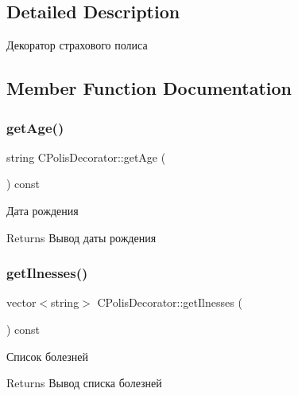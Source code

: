 \subsection{Detailed Description}
Декоратор страхового полиса 

\subsection{Member Function Documentation}
\mbox{\label{classCPolisDecorator_a9e380f2e7020eb4444a0bb3747380918}} 
\subsubsection{\texorpdfstring{get\+Age()}{getAge()}}
{\footnotesize\ttfamily string C\+Polis\+Decorator\+::get\+Age (\begin{DoxyParamCaption}{ }\end{DoxyParamCaption}) const\hspace{0.3cm}{\ttfamily [inline]}}



Дата рождения 

\begin{DoxyReturn}{Returns}
Вывод даты рождения 
\end{DoxyReturn}
\mbox{\label{classCPolisDecorator_ac43dd7017dc2a1dd70d2cf0431cc3e7f}} 
\subsubsection{\texorpdfstring{get\+Ilnesses()}{getIlnesses()}}
{\footnotesize\ttfamily vector$<$string$>$ C\+Polis\+Decorator\+::get\+Ilnesses (\begin{DoxyParamCaption}{ }\end{DoxyParamCaption}) const\hspace{0.3cm}{\ttfamily [inline]}}



Список болезней 

\begin{DoxyReturn}{Returns}
Вывод списка болезней 
\end{DoxyReturn}
\mbox{\label{classCPolisDecorator_afc603d0d42eb72689b103bd47ec225ce}} 
